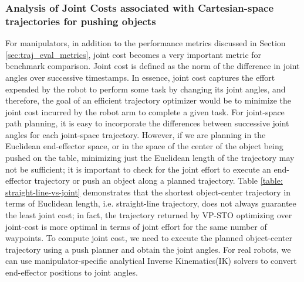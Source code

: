 \subsubsection{Analysis of Joint Costs associated with Cartesian-space trajectories for pushing objects}

For manipulators, in addition to the performance metrics discussed in Section \ref{sec:traj_eval_metrics}, joint cost becomes a very important metric for benchmark comparison. Joint cost is defined as the norm of the difference in joint angles over successive timestamps. In essence, joint cost captures the effort expended by the robot to perform some task by changing its joint angles, and therefore, the goal of an efficient trajectory optimizer would be to minimize the joint cost incurred by the robot arm to complete a given task. For joint-space path planning, it is easy to incorporate the differences between successive joint angles for each joint-space trajectory. However, if we are planning in the Euclidean end-effector space, or in the space of the center of the object being pushed on the table, minimizing just the Euclidean length of the trajectory may not be sufficient; it is important to check for the joint effort to execute an end-effector trajectory or push an object along a planned trajectory. Table \ref{table: straight-line-vs-joint} demonstrates that the shortest object-center trajectory in terms of Euclidean length, i.e. straight-line trajectory, does not always guarantee the least joint cost; in fact, the trajectory returned by VP-STO optimizing over joint-cost is more optimal in terms of joint effort for the same number of waypoints. To compute joint cost, we need to execute the planned object-center trajectory using a push planner and obtain the joint angles. For real robots, we can use manipulator-specific analytical Inverse Kinematics(IK) solvers\cite{Analytical_IK} to convert end-effector positions to joint angles. 

